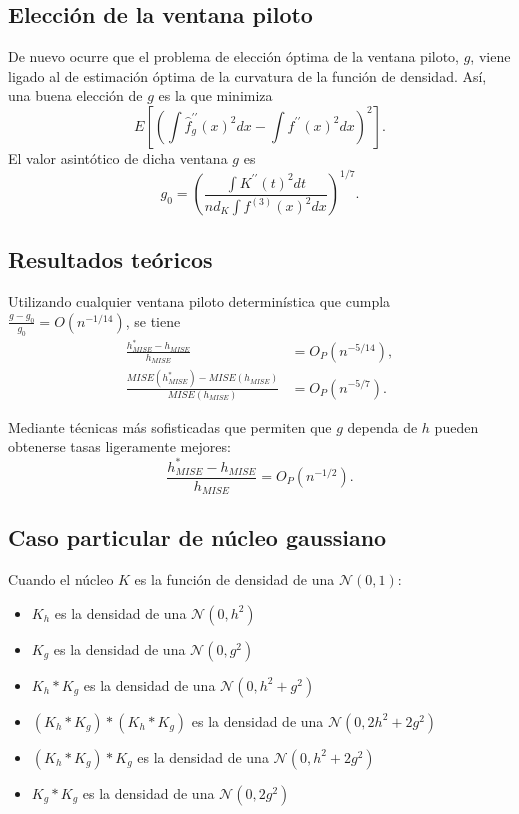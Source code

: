 \documentclass[]{book}
\theoremstyle{definition}
\theoremstyle{definition}
\theoremstyle{definition}
\theoremstyle{remark}
\begin{document}
\subsection{Elección de la ventana
piloto}\label{eleccion-de-la-ventana-piloto}

De nuevo ocurre que el problema de elección óptima de la ventana piloto,
\(g\), viene ligado al de estimación óptima de la curvatura de la
función de densidad. Así, una buena elección de \(g\) es la que
minimiza\[E\left[ \left( \int \hat{f}_{g}^{\prime \prime }\left( x \right)^2dx-\int
f^{\prime \prime }\left( x \right)^2dx \right)^2\right] .\]El valor
asintótico de dicha ventana \(g\)
es\[g_{0}=\left( \frac{\int K^{\prime \prime }\left( t \right)^2dt}{nd_{K}\int
f^{\left( 3 \right)}\left( x \right)^2dx} \right)^{1/7}.\]

\subsection{Resultados teóricos}\label{resultados-teoricos}

Utilizando cualquier ventana piloto determinística que cumpla
\(\frac{g-g_{0}}{g_{0}}=O\left( n^{-1/14} \right)\), se tiene
\[\begin{aligned}
\frac{h_{MISE}^{\ast}-h_{MISE}}{h_{MISE}} &= O_{P}\left( n^{-5/14} \right),\\
\frac{MISE\left( h_{MISE}^{\ast} \right) -MISE\left( h_{MISE} \right)}{
MISE\left( h_{MISE} \right)} &= O_{P}\left( n^{-5/7} \right).
\end{aligned}\]

Mediante técnicas más sofisticadas que permiten que \(g\) dependa de
\(h\) pueden obtenerse tasas ligeramente
mejores:\[\frac{h_{MISE}^{\ast}-h_{MISE}}{h_{MISE}}=O_{P}\left( n^{-1/2} \right).\]

\subsection{Caso particular de núcleo
gaussiano}\label{caso-particular-de-nucleo-gaussiano}

Cuando el núcleo \(K\) es la función de densidad de una
\(\mathcal{N}\left( 0,1 \right)\):

\begin{itemize}
\item
  \(K_{h}\) es la densidad de una \(\mathcal{N}\left( 0,h^2 \right)\)
\item
  \(K_{g}\) es la densidad de una \(\mathcal{N}\left( 0,g^2 \right)\)
\item
  \(K_{h}\ast K_{g}\) es la densidad de una
  \(\mathcal{N}\left( 0,h^2+g^2 \right)\)
\item
  \(\left( K_{h}\ast K_{g} \right) \ast \left( K_{h}\ast K_{g} \right)\)
  es la densidad de una \(\mathcal{N}\left( 0,2h^2+2g^2 \right)\)
\item
  \(\left( K_{h}\ast K_{g} \right) \ast K_{g}\) es la densidad de una
  \(\mathcal{N}\left( 0,h^2+2g^2 \right)\)
\item
  \(K_{g}\ast K_{g}\) es la densidad de una
  \(\mathcal{N}\left( 0,2g^2 \right)\)
\end{itemize}
\end{document}
